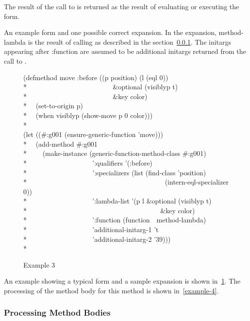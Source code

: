 The result of the call to  is returned as the result of evaluating or
executing the  form. 

An example  form and one possible correct expansion.
In the expansion, method-lambda is the result of calling  as
described in the section~\ref{PROCESSING-METHOD-BODIES}. The initargs appearing
after :function are assumed to be additional initargs returned from the call to
. 

\begin{figure}
\caption{Example 3}
\label{example-3}
\begin{lisp}
(defmethod move :before ((p position) (l (eql 0))\\*
~~~~~~~~~~~~~~~~~~~~~~~~ \&optional (visiblyp t)\\*
~~~~~~~~~~~~~~~~~~~~~~~~ \&key color)\\*
~~(set-to-origin p)\\*
~~(when visiblyp (show-move p 0 color)))\\*
\\
(let ((\#:g001 (ensure-generic-function 'move)))\\*
~~(add-method \#:g001\\*
~~~~(make-instance (generic-function-method-class \#:g001)\\*
~~~~~~~~~~~~~~~~~~ ':qualifiers '(:before)\\*
~~~~~~~~~~~~~~~~~~ ':specializers (list (find-class 'position)\\*
~~~~~~~~~~~~~~~~~~~~~~~~~~~~~~~~~~~~~~~~(intern-eql-specializer 0))\\*
~~~~~~~~~~~~~~~~~~ ':lambda-list '(p l \&optional (visiblyp t)\\*
~~~~~~~~~~~~~~~~~~~~~~~~~~~~~~~~~~~~~~ \&key color)\\*
~~~~~~~~~~~~~~~~~~ ':function (function~~method-lambda)\\*
~~~~~~~~~~~~~~~~~~ 'additional-initarg-1 't\\*
~~~~~~~~~~~~~~~~~~ 'additional-initarg-2 '39)))\\*
\end{lisp}
\end{figure}

An example showing a typical  form and a sample expansion is
shown in~\ref{example-3}. The processing of the method body for this method is shown in~\ref{example-4}.

\subsubsection{Processing Method Bodies}
\label{PROCESSING-METHOD-BODIES}

